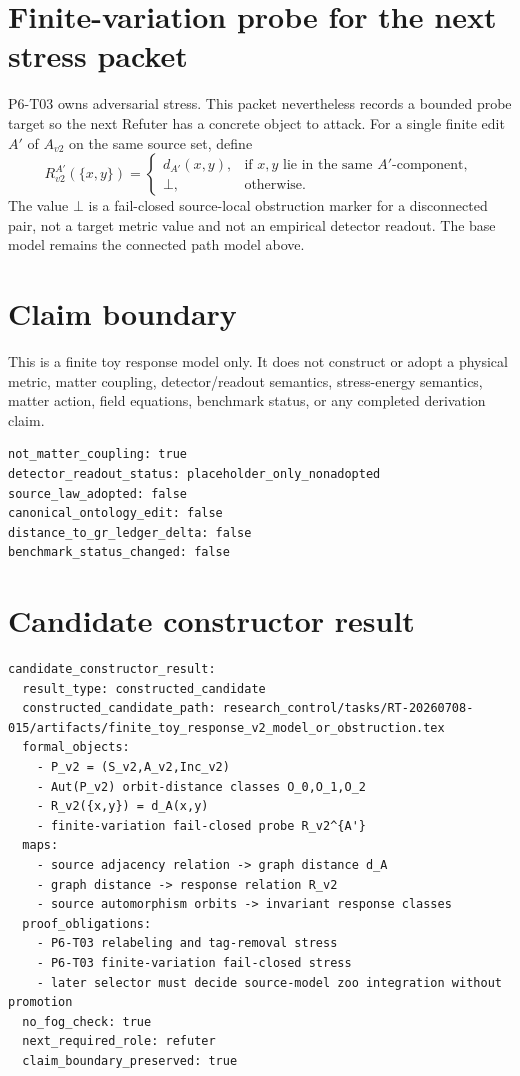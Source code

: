 \documentclass[11pt]{article}
\begin{document}
\section{Finite-variation probe for the next stress packet}

P6-T03 owns adversarial stress. This packet nevertheless records a bounded
probe target so the next Refuter has a concrete object to attack. For a
single finite edit \(A'\) of \(A_{v2}\) on the same source set, define
\[
  R_{v2}^{A'}(\{x,y\})=
  \begin{cases}
    d_{A'}(x,y), & \text{if }x,y\text{ lie in the same }A'\text{-component},\\
    \bot, & \text{otherwise.}
  \end{cases}
\]
The value \(\bot\) is a fail-closed source-local obstruction marker for a
disconnected pair, not a target metric value and not an empirical detector
readout. The base model remains the connected path model above.

\section{Claim boundary}

This is a finite toy response model only. It does not construct or adopt a
physical metric, matter coupling, detector/readout semantics, stress-energy
semantics, matter action, field equations, benchmark status, or any completed
derivation claim.

\begin{verbatim}
not_matter_coupling: true
detector_readout_status: placeholder_only_nonadopted
source_law_adopted: false
canonical_ontology_edit: false
distance_to_gr_ledger_delta: false
benchmark_status_changed: false
\end{verbatim}

\section{Candidate constructor result}

\begin{verbatim}
candidate_constructor_result:
  result_type: constructed_candidate
  constructed_candidate_path: research_control/tasks/RT-20260708-015/artifacts/finite_toy_response_v2_model_or_obstruction.tex
  formal_objects:
    - P_v2 = (S_v2,A_v2,Inc_v2)
    - Aut(P_v2) orbit-distance classes O_0,O_1,O_2
    - R_v2({x,y}) = d_A(x,y)
    - finite-variation fail-closed probe R_v2^{A'}
  maps:
    - source adjacency relation -> graph distance d_A
    - graph distance -> response relation R_v2
    - source automorphism orbits -> invariant response classes
  proof_obligations:
    - P6-T03 relabeling and tag-removal stress
    - P6-T03 finite-variation fail-closed stress
    - later selector must decide source-model zoo integration without promotion
  no_fog_check: true
  next_required_role: refuter
  claim_boundary_preserved: true
\end{verbatim}
\end{document}
